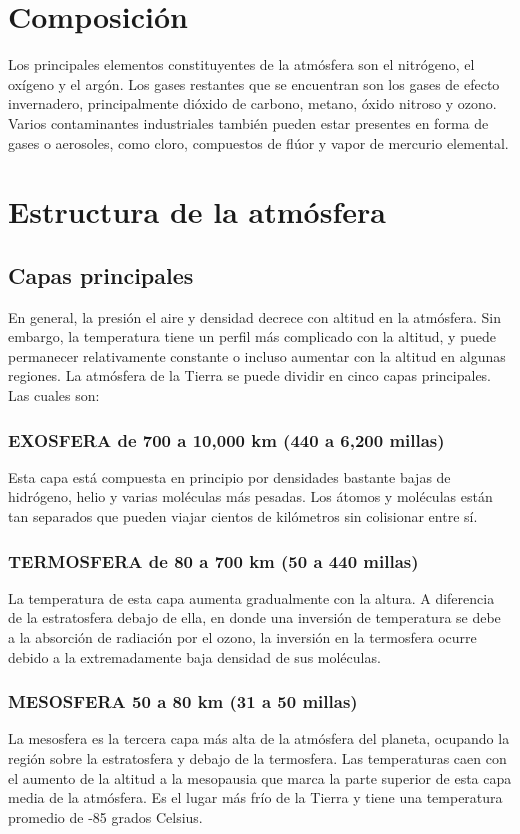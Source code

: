\documentclass{article}
\begin{document}
  
  
  
\section{Composición}

Los principales elementos constituyentes de la atmósfera son el nitrógeno, el oxígeno y el argón. Los gases restantes que se encuentran son los gases de efecto invernadero, principalmente dióxido de carbono, metano, óxido nitroso y ozono. Varios contaminantes industriales también pueden estar presentes en forma de gases o aerosoles, como cloro, compuestos de flúor y vapor de mercurio elemental. 

\section{Estructura de la atmósfera}

\subsection{Capas principales}

En general, la presión el aire y densidad decrece con altitud en la atmósfera. Sin embargo, la temperatura tiene un perfil más complicado con la altitud, y puede permanecer relativamente constante o incluso aumentar con la altitud en algunas regiones.  La atmósfera de la Tierra se puede dividir en cinco capas principales. Las cuales son:


\subsubsection{EXOSFERA de 700 a 10,000 km (440 a 6,200 millas)}
  Esta capa está compuesta en principio por densidades bastante bajas de hidrógeno, helio y varias moléculas más pesadas. Los átomos y moléculas están tan separados que pueden viajar cientos de kilómetros sin colisionar entre sí. 
\subsubsection{TERMOSFERA de 80 a 700 km (50 a 440 millas)}
  La temperatura de esta capa aumenta gradualmente con la altura. A diferencia de la estratosfera debajo de ella, en donde una inversión de temperatura se debe a la absorción de radiación por el ozono, la inversión en la termosfera ocurre debido a la extremadamente baja densidad de sus moléculas. 
\subsubsection{MESOSFERA 50 a 80 km (31 a 50 millas)}
La mesosfera es la tercera capa más alta de la atmósfera del planeta, ocupando la región sobre la estratosfera y debajo de la termosfera. Las temperaturas caen con el aumento de la altitud a la mesopausia que marca la parte superior de esta capa media de la atmósfera. Es el lugar más frío de la Tierra y tiene una temperatura promedio de -85 grados Celsius. 
\end{document}
